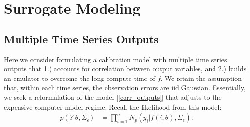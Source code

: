 \documentclass[12pt]{article}
\begin{document}
\section{Surrogate Modeling}

\subsection{Multiple Time Series Outputs}
Here we consider formulating a calibration model with multiple time series outputs that 1.) accounts for correlation between output variables, 
and 2.) builds an emulator to overcome the long compute time of $f$. We retain the assumption that, within each time series, the observation 
errors are iid Gaussian. Essentially, we seek a reformulation of the model [\ref{corr_outputs}] that adjusts to the expensive computer model 
regime. Recall the likelihood from this model:
\begin{align}
p(Y|\theta, \Sigma_\epsilon) &= \prod_{i = 1}^{n} N_p(y_i|f(i, \theta), \Sigma_\epsilon). \label{corr_output_lik}
\end{align}
\end{document}
